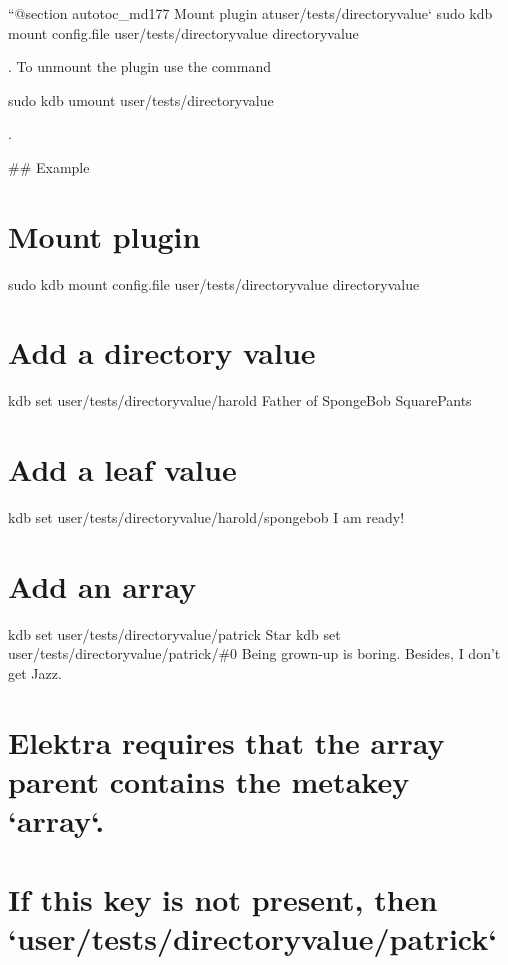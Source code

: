 ``{\ttfamily  @section autotoc\+\_\+md177 Mount plugin at}user/tests/directoryvalue` sudo kdb mount config.\+file user/tests/directoryvalue directoryvalue 
\begin{DoxyCode}
. To unmount the plugin use the command
\end{DoxyCode}
 sudo kdb umount user/tests/directoryvalue 
\begin{DoxyCode}
.

## Example
\end{DoxyCode}
 \hypertarget{autotoc_md172_autotoc_md178}{}\section{Mount plugin}\label{autotoc_md172_autotoc_md178}
sudo kdb mount config.\+file user/tests/directoryvalue directoryvalue\hypertarget{autotoc_md172_autotoc_md179}{}\section{Add a directory value}\label{autotoc_md172_autotoc_md179}
kdb set user/tests/directoryvalue/harold \textquotesingle{}Father of Sponge\+Bob Square\+Pants\textquotesingle{} \hypertarget{autotoc_md172_autotoc_md180}{}\section{Add a leaf value}\label{autotoc_md172_autotoc_md180}
kdb set user/tests/directoryvalue/harold/spongebob \textquotesingle{}I am ready!\textquotesingle{}\hypertarget{autotoc_md172_autotoc_md181}{}\section{Add an array}\label{autotoc_md172_autotoc_md181}
kdb set user/tests/directoryvalue/patrick Star kdb set user/tests/directoryvalue/patrick/\#0 \textquotesingle{}Being grown-\/up is boring. Besides, I don’t get Jazz.\textquotesingle{} \hypertarget{autotoc_md172_autotoc_md182}{}\section{Elektra requires that the array parent contains the metakey `array`.}\label{autotoc_md172_autotoc_md182}
\hypertarget{autotoc_md172_autotoc_md183}{}\section{If this key is not present, then `user/tests/directoryvalue/patrick`}\label{autotoc_md172_autotoc_md183}
